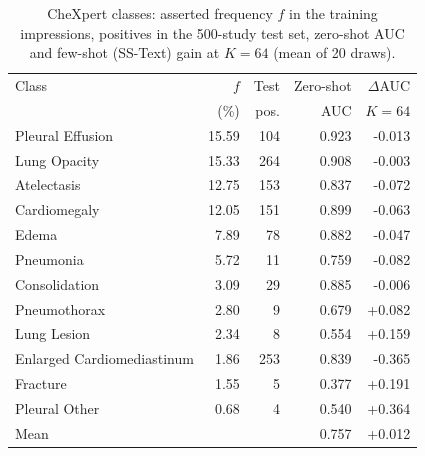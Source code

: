 \begin{table}[!t]
\centering
\footnotesize
\caption{CheXpert classes: asserted frequency $f$ in the training impressions, positives in the 500-study
test set, zero-shot AUC and few-shot (SS-Text) gain at $K=64$ (mean of 20 draws).}
\label{tab:cxpclasses}
\setlength{\tabcolsep}{3pt}
\begin{tabular}{lrrrr}
\toprule
Class & $f$ & Test & Zero-shot & $\Delta$AUC \\
 & (\%) & pos. & AUC & $K{=}64$ \\
\midrule
Pleural Effusion & 15.59 & 104 & 0.923 & -0.013 \\
Lung Opacity & 15.33 & 264 & 0.908 & -0.003 \\
Atelectasis & 12.75 & 153 & 0.837 & -0.072 \\
Cardiomegaly & 12.05 & 151 & 0.899 & -0.063 \\
Edema & 7.89 & 78 & 0.882 & -0.047 \\
Pneumonia & 5.72 & 11 & 0.759 & -0.082 \\
Consolidation & 3.09 & 29 & 0.885 & -0.006 \\
Pneumothorax & 2.80 & 9 & 0.679 & +0.082 \\
Lung Lesion & 2.34 & 8 & 0.554 & +0.159 \\
Enlarged Cardiomediastinum & 1.86 & 253 & 0.839 & -0.365 \\
Fracture & 1.55 & 5 & 0.377 & +0.191 \\
Pleural Other & 0.68 & 4 & 0.540 & +0.364 \\
\midrule
Mean & & & 0.757 & +0.012 \\
\bottomrule
\end{tabular}
\end{table}
